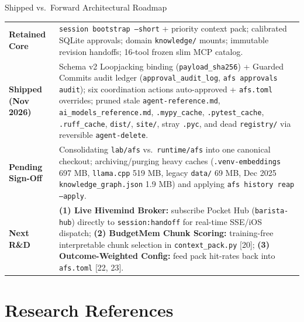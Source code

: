 \documentclass[10pt,letterpaper]{article}
\newcommand{\code}[1]{\texttt{\color{InkNavy}#1}}
\begin{document}
\begin{tealbox}{Shipped vs.\ Forward Architectural Roadmap}
\begin{tabularx}{\textwidth}{@{}>{\raggedright\bfseries\arraybackslash}p{2.35cm} >{\raggedright\arraybackslash}X@{}}
\color{ForestTeal}Retained Core & \code{session bootstrap --short} + priority context pack; calibrated SQLite approvals; domain \code{knowledge/} mounts; immutable revision handoffs; 16-tool frozen slim MCP catalog. \\
\addlinespace[2.5pt]
\color{ForestTeal}Shipped (Nov 2026) & Schema v2 Loopjacking binding (\code{payload\_sha256}) + Guarded Commits audit ledger (\code{approval\_audit\_log}, \code{afs approvals audit}); six coordination actions auto-approved + \code{afs.toml} overrides; pruned stale \code{agent-reference.md}, \code{ai\_models\_reference.md}, \code{.mypy\_cache}, \code{.pytest\_cache}, \code{.ruff\_cache}, \code{dist/}, \code{site/}, stray \code{.pyc}, and dead \code{registry/} via reversible \code{agent-delete}. \\
\addlinespace[2.5pt]
\color{WarmAmber}Pending Sign-Off & Consolidating \code{lab/afs} vs.\ \code{runtime/afs} into one canonical checkout; archiving/purging heavy caches (\code{.venv-embeddings} 697 MB, \code{llama.cpp} 519 MB, legacy \code{data/} 69 MB, Dec 2025 \code{knowledge\_graph.json} 1.9 MB) and applying \code{afs history reap --apply}. \\
\addlinespace[2.5pt]
\color{SlateBlue}Next R\&D & \textbf{(1) Live Hivemind Broker:} subscribe Pocket Hub (\code{barista-hub}) directly to \code{session:handoff} for real-time SSE/iOS dispatch; \textbf{(2) BudgetMem Chunk Scoring:} training-free interpretable chunk selection in \code{context\_pack.py} [20]; \textbf{(3) Outcome-Weighted Config:} feed pack hit-rates back into \code{afs.toml} [22, 23]. \\
\end{tabularx}
\end{tealbox}

\clearpage
\section{Research References}
\end{document}
